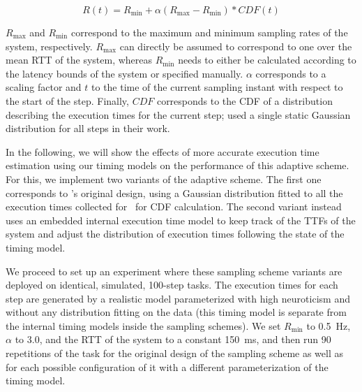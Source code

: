 \begin{equation}
    R(t) = R_\text{min} + \alpha\left( R_\text{max} - R_\text{min} \right) * CDF(t)
\end{equation}

\( R_\text{max} \) and \( R_\text{min} \) correspond to the maximum and minimum sampling rates of the system, respectively.
\( R_\text{max} \) can directly be assumed to correspond to one over the mean \ac{RTT} of the system, whereas \( R_\text{min} \) needs to either be calculated according to the latency bounds of the system or specified manually.
\( \alpha \) corresponds to a scaling factor and \( t \) to the time of the current sampling instant with respect to the start of the step.
Finally, \( CDF \) corresponds to the \acl*{CDF} of a distribution describing the execution times for the current step; \citeauthor{Wang2019Towards} used a single static Gaussian distribution for all steps in their work.

In the following, we will show the effects of more accurate execution time estimation using our timing models on the performance of this adaptive scheme.
For this, we implement two variants of the adaptive scheme.
The first one corresponds to \citeauthor{Wang2019Towards}'s original design, using a Gaussian distribution fitted to all the execution times collected for~\cite{olguinmunoz:impact2021} for \ac{CDF} calculation.
The second variant instead uses an embedded internal execution time model to keep track of the \acp{TTF} of the system and adjust the distribution of execution times following the state of the timing model.

We proceed to set up an experiment where these sampling scheme variants are deployed on identical, simulated, \num{100}-step tasks.
The execution times for each step are generated by a realistic model parameterized with high neuroticism and without any distribution fitting on the data (this timing model is separate from the internal timing models inside the sampling schemes).
We set \( R_\text{min} \) to \SI{0.5}{\hertz}, \( \alpha \) to \num{3.0}, and the \ac{RTT} of the system to a constant \SI{150}{\milli\second}, and then run \num{90} repetitions of the task for the original design of the sampling scheme as well as for each possible configuration of it with a different parameterization of the timing model.

